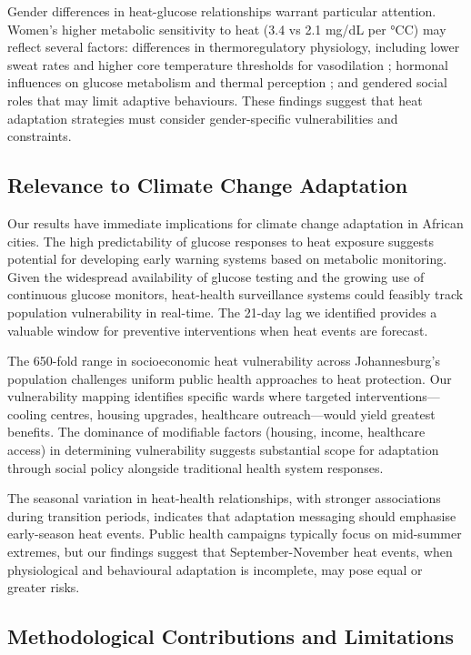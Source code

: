 \documentclass[11pt,a4paper]{article}
\newcommand{\degrees}{°C}
\begin{document}
Gender differences in heat-glucose relationships warrant particular attention. Women's higher metabolic sensitivity to heat (3.4 vs 2.1 mg/dL per \degrees C) may reflect several factors: differences in thermoregulatory physiology, including lower sweat rates and higher core temperature thresholds for vasodilation \citep{Gagnon2013}; hormonal influences on glucose metabolism and thermal perception \citep{Charkoudian2017}; and gendered social roles that may limit adaptive behaviours. These findings suggest that heat adaptation strategies must consider gender-specific vulnerabilities and constraints.

\subsection{Relevance to Climate Change Adaptation}

Our results have immediate implications for climate change adaptation in African cities. The high predictability of glucose responses to heat exposure suggests potential for developing early warning systems based on metabolic monitoring. Given the widespread availability of glucose testing and the growing use of continuous glucose monitors, heat-health surveillance systems could feasibly track population vulnerability in real-time. The 21-day lag we identified provides a valuable window for preventive interventions when heat events are forecast.

The 650-fold range in socioeconomic heat vulnerability across Johannesburg's population challenges uniform public health approaches to heat protection. Our vulnerability mapping identifies specific wards where targeted interventions—cooling centres, housing upgrades, healthcare outreach—would yield greatest benefits. The dominance of modifiable factors (housing, income, healthcare access) in determining vulnerability suggests substantial scope for adaptation through social policy alongside traditional health system responses.

The seasonal variation in heat-health relationships, with stronger associations during transition periods, indicates that adaptation messaging should emphasise early-season heat events. Public health campaigns typically focus on mid-summer extremes, but our findings suggest that September-November heat events, when physiological and behavioural adaptation is incomplete, may pose equal or greater risks.

\subsection{Methodological Contributions and Limitations}
\end{document}
